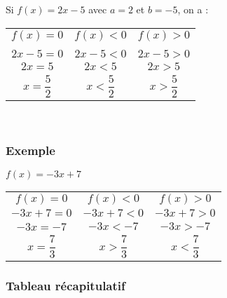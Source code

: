 Si $ f(x) = 2x-5 $ avec $a = 2$ et $b = -5$, on a : \\

\begin{tabular}{ccc}

$f(x) = 0$ & $f(x) < 0 $ & $f(x) > 0$ \\
\\
$2x - 5 = 0$ & $2x - 5 < 0$ & $2x - 5 > 0$ \\
$2x = 5 $ & $ 2x < 5 $ & $2x > 5 $ \\
$ x = \dfrac{5}{2} $ & $x <\dfrac{5}{2}$ & $x>\dfrac{5}{2}$ \\
\end{tabular}\\




\subsubsection{Exemple }

$ f(x) = -3x + 7 $ \\

\begin{tabular}{ccc}

$f(x) = 0$ & $f(x) < 0 $ & $f(x) > 0$ \\

$-3x +7 = 0$ & $-3x +7 < 0$ & $-3x +7 > 0$ \\
$-3x = -7 $ & $ -3x < -7 $ & $-3x > -7 $ \\
$ x = \dfrac{7}{3} $ & $x >\dfrac{7}{3}$ & $x<\dfrac{7}{3}$ \\
\end{tabular}


\subsubsection{Tableau récapitulatif}

